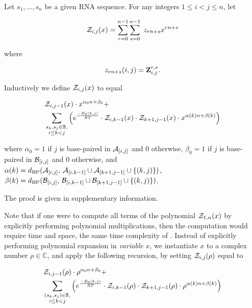 \begin{theorem}
Let $s_1,\dots,s_n$ be a given RNA sequence.
For any integers $1 \leq i < j \leq n$, let

\begin{align}
{\mathcal Z}_{i,j}(x) = \sum_{r=0}^{n-1} \sum_{s=0}^{n-1}\; z_{rn+s} x^{rn+s}
\end{align}

where

\begin{align}
z_{rn+s}(i,j) = {\bf Z}^{r,s}_{i,j}.
\end{align}

Inductively we define ${\mathcal Z}_{i,j}(x)$ to equal

\begin{align}
\label{eq:ffttwo:polyRecNussJac}
&\emZof{i,j-1}{x} \cdot x^{\alpha_0n+\beta_0} + \\
&\sum_{\substack{s_k,s_j \in \bpSet,\\i\le k<j}}
\left(\boltzNuss{k,j}\cdot
\emZof{i,k-1}{x} \cdot \emZof{k+1,j-1}{x}\cdot x^{\alpha(k)n+\beta(k)} \right)
\end{align}

where $\alpha_0 = 1$ if $j$ is base-paired in $\mathcal A_{[i,j]}$ and $0$ otherwise,
$\beta_0 = 1$ if $j$ is base-paired in $\mathcal B_{[i,j]}$ and $0$ otherwise, and
$\alpha(k) =
d_{\text{BP}}(\mathcal A_{[i,j]},\,\mathcal A_{[i,k-1]} \cup \mathcal A_{[k+1,j-1]} \cup \{ (k,j) \})$,
$\beta(k) =
d_{\text{BP}}(\mathcal B_{[i,j]},\,\mathcal B_{[i,k-1]} \cup \mathcal B_{[k+1,j-1]} \cup \{ (k,j) \})$.

The proof is given in supplementary information.
\end{theorem}

Note that if one were to compute all terms of the polynomial ${\mathcal Z}_{1,n}(x)$
by explicitly performing polynomial multiplications,
then the computation would require  time and  space, the
same time complexity of \cite{hofacker:RNAbor2D}.
Instead of explicitly performing polynomial expansion in {\em variable} $x$,
we instantiate $x$ to a
complex number $\rho \in \mathbb{C}$, and apply
the following recursion, by setting ${\mathcal Z}_{i,j}(\rho)$ equal to

\begin{align}
\label{eqn:ffttwo:polyRecNussJacInit}
\begin{split}
&\emZof{i,j-1}{\rho} \cdot \rho^{\alpha_0n+\beta_0} + \\
&\sum_{\substack{(s_k,s_j) \in \bpSet,\\i\le k<j}}
\left(\boltzNuss{k,j}\cdot
\emZof{i,k-1}{\rho} \cdot \emZof{k+1,j-1}{\rho}
\cdot \rho^{\alpha(k)n+\beta(k)} \right)
\end{split}
\end{align}

